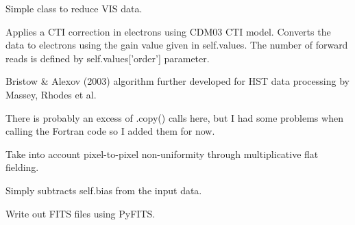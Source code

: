 \documentclass[a4paper,12pt,english]{sphinxmanual}
\begin{document}
\begin{fulllineitems}
\label{reduction:reduction.reduceVISdata.reduceVISdata}
Simple class to reduce VIS data.

\begin{fulllineitems}
\label{reduction:reduction.reduceVISdata.reduceVISdata.applyCTICorrection}
Applies a CTI correction in electrons using CDM03 CTI model.
Converts the data to electrons using the gain value given in self.values.
The number of forward reads is defined by self.values{[}'order'{]} parameter.

Bristow \& Alexov (2003) algorithm further developed for HST data
processing by Massey, Rhodes et al.

There is probably an excess of .copy() calls here, but I had some problems
when calling the Fortran code so I added them for now.

\end{fulllineitems}


\begin{fulllineitems}
\label{reduction:reduction.reduceVISdata.reduceVISdata.flatfield}
Take into account pixel-to-pixel non-uniformity through multiplicative flat fielding.

\end{fulllineitems}


\begin{fulllineitems}
\label{reduction:reduction.reduceVISdata.reduceVISdata.subtractBias}
Simply subtracts self.bias from the input data.

\end{fulllineitems}


\begin{fulllineitems}
\label{reduction:reduction.reduceVISdata.reduceVISdata.writeFITSfile}
Write out FITS files using PyFITS.

\end{fulllineitems}


\end{fulllineitems}
\end{document}
